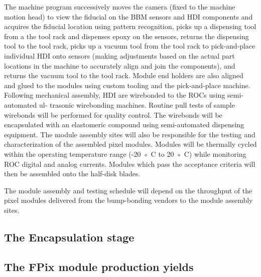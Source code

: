 The machine program successively moves the camera (fixed to the machine motion head) to view the fiducial on the BBM sensors and HDI components and acquires the fiducial location using pattern recognition,
picks up a dispensing tool from a the tool rack and dispenses epoxy on the sensors, returns the dispensing tool to the tool rack, picks up a vacuum tool from the tool rack to pick-and-place individual HDI onto sensors (making adjustments based on the actual part locations in the machine to accurately align and join the components), and returns the vacuum tool to the tool rack. Module end holders are also aligned and glued to the modules using custom tooling and the pick-and-place machine. Following mechanical assembly, HDI are wirebonded to the ROCs using semi-automated ul-
trasonic wirebonding machines. Routine pull tests of sample wirebonds will be performed
for quality control. The wirebonds will be encapsulated with an elastomeric compound using
semi-automated dispensing equipment. The module assembly sites will also be responsible for
the testing and characterization of the assembled pixel modules. Modules will be thermally
cycled within the operating temperature range (-20 ◦ C to 20 ◦ C) while monitoring ROC digital
and analog currents. Modules which pass the acceptance criteria will then be assembled onto
the half-disk blades.

The module assembly and testing schedule will depend on the throughput of the pixel modules delivered from the bump-bonding vendors to the module
assembly sites.





\subsection{The Encapsulation stage}


\subsection{The FPix module production yields}

